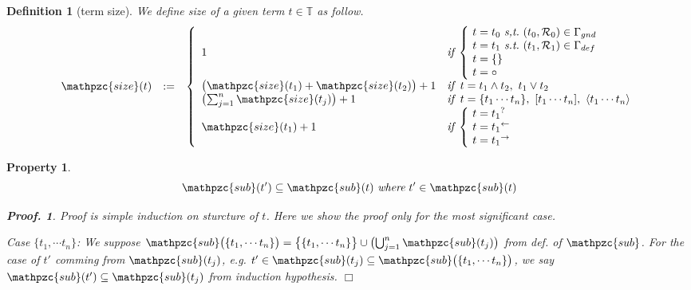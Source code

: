 \documentclass[12pt]{article}
\newtheorem{Definition}{Definition}[section]
\newtheorem{Property}{Property}[section]
\newtheorem{Proof}{Proof.}
\begin{document}
\begin{Definition}[term size]
  We define size of a given term $t \in \mathbb{T}$ as follow.
  \begin{displaymath}
    \begin{array}{lll}
      \mathpzc{size}(t) &:=
      & \left\{ \begin{array}{ll}
          1  & \text{\it if}\;
                \left\{ \! \begin{array}{l}
                  t = t_0\ \text{\it s,t.}\
                   (t_0, \mathcal{R}_0) \in \Gamma_{gnd}  \\
                  t = t_1\ \text{\it s.t.}\
                   (t_1, \mathcal{R}_1) \in \Gamma_{def}  \\
                  t = \{\}  \\
                  t = \circ
                \end{array} \right.  \\
          \bigl(\mathpzc{size}(t_1) + \mathpzc{size}(t_2) \bigr) + 1  &
           \text{\it if}\;\; t = t_1 \wedge t_2,\ t_1 \vee t_2  \\
          \bigl(\sum_{j=1}^{n} \mathpzc{size}(t_j) \bigr) + 1  &
           \text{\it if}\;\; t = \{t_1 \cdots t_n \},
            \ [t_1 \cdots t_n ], \ \langle t_1 \cdots t_n \rangle  \\
          \mathpzc{size}(t_1) + 1  &
           \text{\it if}\; \left\{ \! \begin{array}{l}
             t = {t_1}^?  \\
             t = {t_1}^\leftarrow \\
             t = {t_1}^\rightarrow
           \end{array} \right.
        \end{array} \right.
    \end{array}
  \end{displaymath}
\end{Definition}


\begin{Property}
  \label{self_similarity_on_subterms}
  \[ \mathpzc{sub}(t') \subseteq \mathpzc{sub}(t)\ \text{\it where}\
      t' \in \mathpzc{sub}(t)
  \]
  \begin{Proof}
    Proof is simple induction on sturcture of $t$.
    Here we show the proof only for the most significant case.
    
    Case $\{t_1, \cdots t_n\}$:
    We suppose $\mathpzc{sub}\bigl(\{t_1, \cdots t_n\} \bigr) =
    \bigl\{\{t_1, \cdots t_n\} \bigr\} \cup
    \bigl(\bigcup_{j=1}^n \mathpzc{sub}(t_j) \bigr)$ from def. of
    $\mathpzc{sub}$. For the case of $t'$ comming from
    $\mathpzc{sub}(t_j)$, e.g. $t' \in \mathpzc{sub}(t_j) \subseteq
    \mathpzc{sub}\bigl(\{t_1, \cdots t_n\} \bigr)$, we say
    $\mathpzc{sub}(t') \subseteq \mathpzc{sub}(t_j)$ from
    induction hypothesis.
    $\Box$
  \end{Proof}
\end{Property}
\end{document}
